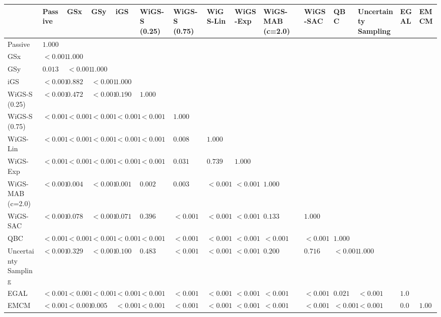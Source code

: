 \begin{tabular}{lllllllllllllll}
\toprule
 & Passive & GSx & GSy & iGS & WiGS-S (0.25) & WiGS-S (0.75) & WiGS-Lin & WiGS-Exp & WiGS-MAB (c=2.0) & WiGS-SAC & QBC & Uncertainty Sampling & EGAL & EMCM \\
\midrule
Passive & $1.000$ &  &  &  &  &  &  &  &  &  &  &  &  &  \\
GSx & $<0.001$ & $1.000$ &  &  &  &  &  &  &  &  &  &  &  &  \\
GSy & $0.013$ & $<0.001$ & $1.000$ &  &  &  &  &  &  &  &  &  &  &  \\
iGS & $<0.001$ & $0.882$ & $<0.001$ & $1.000$ &  &  &  &  &  &  &  &  &  &  \\
WiGS-S (0.25) & $<0.001$ & $0.472$ & $<0.001$ & $0.190$ & $1.000$ &  &  &  &  &  &  &  &  &  \\
WiGS-S (0.75) & $<0.001$ & $<0.001$ & $<0.001$ & $<0.001$ & $<0.001$ & $1.000$ &  &  &  &  &  &  &  &  \\
WiGS-Lin & $<0.001$ & $<0.001$ & $<0.001$ & $<0.001$ & $<0.001$ & $0.008$ & $1.000$ &  &  &  &  &  &  &  \\
WiGS-Exp & $<0.001$ & $<0.001$ & $<0.001$ & $<0.001$ & $<0.001$ & $0.031$ & $0.739$ & $1.000$ &  &  &  &  &  &  \\
WiGS-MAB (c=2.0) & $<0.001$ & $0.004$ & $<0.001$ & $0.001$ & $0.002$ & $0.003$ & $<0.001$ & $<0.001$ & $1.000$ &  &  &  &  &  \\
WiGS-SAC & $<0.001$ & $0.078$ & $<0.001$ & $0.071$ & $0.396$ & $<0.001$ & $<0.001$ & $<0.001$ & $0.133$ & $1.000$ &  &  &  &  \\
QBC & $<0.001$ & $<0.001$ & $<0.001$ & $<0.001$ & $<0.001$ & $<0.001$ & $<0.001$ & $<0.001$ & $<0.001$ & $<0.001$ & $1.000$ &  &  &  \\
Uncertainty Sampling & $<0.001$ & $0.329$ & $<0.001$ & $0.100$ & $0.483$ & $<0.001$ & $<0.001$ & $<0.001$ & $0.200$ & $0.716$ & $<0.001$ & $1.000$ &  &  \\
EGAL & $<0.001$ & $<0.001$ & $<0.001$ & $<0.001$ & $<0.001$ & $<0.001$ & $<0.001$ & $<0.001$ & $<0.001$ & $<0.001$ & $0.021$ & $<0.001$ & $1.000$ &  \\
EMCM & $<0.001$ & $<0.001$ & $0.005$ & $<0.001$ & $<0.001$ & $<0.001$ & $<0.001$ & $<0.001$ & $<0.001$ & $<0.001$ & $<0.001$ & $<0.001$ & $0.050$ & $1.000$ \\
\bottomrule
\end{tabular}
